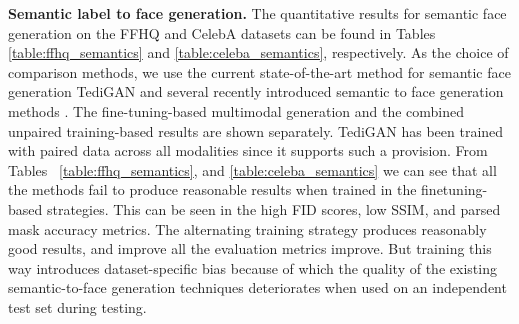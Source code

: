 \documentclass[10pt,twocolumn,letterpaper]{article}
\begin{document}
\noindent\textbf{Semantic label to face generation.} The quantitative results for semantic face generation on the FFHQ and CelebA datasets can be found in Tables \ref{table:ffhq_semantics} and \ref{table:celeba_semantics}, respectively. 
As the choice of comparison methods, we use the current state-of-the-art method for semantic face generation TediGAN \cite{xia2021tedigan} and several recently introduced semantic to face generation methods \cite{park2019SPADE,wang2018pix2pixHD,oasis,tan2021diverse}.
The fine-tuning-based multimodal generation and the combined unpaired  
training-based results are shown separately.  TediGAN \cite{xia2021tedigan} has been trained with paired data across all modalities since it supports such a provision. From Tables~ \ref{table:ffhq_semantics}, and \ref{table:celeba_semantics} we can see that all the methods fail to produce reasonable results when trained in the finetuning-based strategies. This can be seen in the high FID scores, low SSIM, and parsed mask accuracy metrics. The alternating training strategy produces reasonably good results, and improve all the evaluation metrics improve. But training this way introduces dataset-specific bias because of which the quality of the existing semantic-to-face generation techniques deteriorates when used on an independent test set during testing. 
\end{document}

